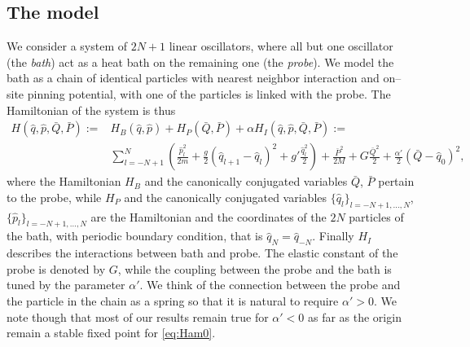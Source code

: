 \documentclass[11pt]{article}
\numberwithin{equation}{section}
\numberwithin{theorem}{section}
\def\sp{g}
\def\Sp{G}
\begin{document}
\subsection{The model}\label{subsec:model}

We consider a system of $2N+1$ linear oscillators, where all but one oscillator (the {\it bath}) act as a heat bath on
the remaining one (the {\it probe}). We model the bath as a chain of identical particles with nearest neighbor
interaction and on--site pinning potential, with one of the particles is linked with the probe. The Hamiltonian of
the system is thus
\begin{equation}\label{eq:Ham0}
\begin{aligned}
H(\hat q,\hat p,\bar Q,\bar P):=& H_B(\hat q,\hat p)+H_P(\bar Q,\bar P)+\alpha H_I(\hat q,\hat p,\bar Q,\bar P):=\\
&\sum_{l=-N+1}^{N} \left(\frac{\hat
  p_l^2}{2m}+\frac{\sp}2(\hat q_{l+1}-\hat
q_l)^2+\sp'\frac{\hat q_l^2}2\right) + \frac{\bar
  P^2}{2M}+\Sp\frac{\bar Q^2}2
+ \frac{\alpha'}2(\bar Q-\hat q_0)^2 ,
\end{aligned}
\end{equation}
where the Hamiltonian $H_B$ and the canonically conjugated variables $\bar Q$, $\bar P$ pertain to the probe, while
$H_P$ and the canonically conjugated variables $\{\hat q_l\}_{l=-N+1,\ldots,N}$, $\{\hat p_l\}_{l=-N+1,\ldots,N}$ are
the Hamiltonian and the coordinates of the $2N$ particles of the bath, with periodic boundary condition, that is $\hat
q_N=\hat q_{-N}$. Finally $H_I$ describes the interactions between bath and probe. The elastic constant of the probe is
denoted by $\Sp$, while the coupling between the probe and the bath is tuned by the parameter $\alpha'$. We think of the
connection between the probe and the particle in the chain as a spring so that it is natural to require $\alpha'>0$. We
note though that most of our results remain true for $\alpha'<0$ as far as the origin remain a stable fixed point for
\eqref{eq:Ham0}. 
\end{document}

